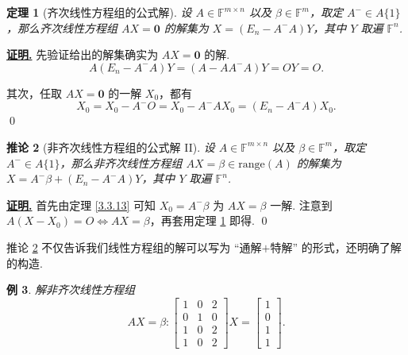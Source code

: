 \documentclass[10pt,openany]{article}
\theoremstyle{thmstyle} %
\newtheorem{theorem}{定理}[subsection]
\theoremstyle{defstyle} %
\newtheorem{corollary}[theorem]{推论}
\theoremstyle{prostyle} %
\theoremstyle{exastyle}
\newtheorem{example}[theorem]{例}
\theoremstyle{remstyle}
\renewenvironment{proof}[1][证明]{\par\underline{\textbf{#1.}} \;\fangsong}{\qed\par}
\newcommand{\F}{\mathbb{F}}
\newcommand{\mn}{^{m \times n}}
\begin{document}
\begin{theorem}[齐次线性方程组的公式解] \label{3.3.14}
	设 \( A \in \F\mn \) 以及 \( \beta \in \F^m \)，取定 \( A^{-} \in A\{1\} \)，那么齐次线性方程组 \( AX=\bm{0} \) 的解集为 \( X=(E_n-A^{-}A)Y \)，其中 \( Y \) 取遍 \( \F^n \). 
\end{theorem}

\begin{proof}
	先验证给出的解集确实为 \( AX=\bm{0} \) 的解.
	\[ A(E_n-A^{-}A)Y=(A-AA^{-}A)Y=OY=O. \]
	
	其次，任取 \( AX=\bm{0} \) 的一解 \( X_0 \)，都有 
	\[ X_0=X_0-A^{-}O=X_0-A^{-}AX_0=(E_n-A^{-}A)X_0. \]
\end{proof}

\begin{corollary}[非齐次线性方程组的公式解 II] \label{3.3.15}
	设 \( A \in \F\mn \) 以及 \( \beta \in \F^m \)，取定 \( A^{-} \in A\{1\} \)，那么非齐次线性方程组 \( AX=\beta \in \text{range}(A) \) 的解集为 \( X=A^{-}\beta+(E_n-A^{-}A)Y \)，其中 \( Y \) 取遍 \( \F^n \). 
\end{corollary}

\begin{proof}
	首先由定理 \ref{3.3.13} 可知 \( X_0=A^{-}\beta \) 为 \( AX=\beta \) 一解. 注意到 \( A(X-X_0)=O \Leftrightarrow AX=\beta \)，再套用定理 \ref{3.3.14} 即得.
\end{proof}

推论 \ref{3.3.15} 不仅告诉我们线性方程组的解可以写为 “通解\(+\)特解” 的形式，还明确了解的构造. 
 
\begin{example}
	解非齐次线性方程组
	\[ AX=\beta: \begin{bmatrix}
		1 & 0 & 2 \\
		0 & 1 & 0 \\
		1 & 0 & 2 \\
		1 & 0 & 2
	\end{bmatrix}X=\begin{bmatrix}
	 1 \\ 0 \\ 1 \\ 1
	\end{bmatrix}. \]
\end{example}
\end{document}
